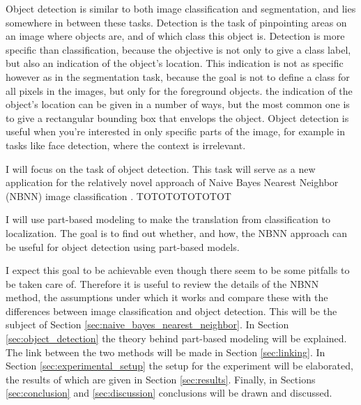 \documentclass[a4paper,10pt]{article}
\begin{document}
Object detection is similar to both image classification and segmentation, and lies somewhere in between these tasks. Detection is the task of pinpointing areas on an image where objects are, and of which class this object is. Detection is more specific than classification, because the objective is not only to give a class label, but also an indication of the object's location. This indication is not as specific however as in the segmentation task, because the goal is not to define a class for all pixels in the images, but only for the foreground objects. the indication of the object's location can be given in a number of ways, but the most common one is to give a rectangular bounding box that envelops the object. Object detection is useful when you're interested in only specific parts of the image, for example in tasks like face detection, where the context is irrelevant. 



I will focus on the task of object detection. This task will serve as a new application for the relatively novel approach of Naive Bayes Nearest Neighbor (NBNN) image classification \cite{boiman2008defense} .  TOTOTOTOTOTOT

I will use part-based modeling  to make the translation from classification to localization. The goal is to find out whether, and how, the NBNN approach can be useful for object detection using part-based models.

I expect this goal to be achievable even though there seem to be some pitfalls to be taken care of. Therefore it is useful to review the details of the NBNN method, the assumptions under which it works and compare these with the differences between image classification and object detection. This will be the subject of Section \ref{sec:naive_bayes_nearest_neighbor}. In Section \ref{sec:object_detection} the theory behind part-based modeling will be explained. The link between the two methods will be made in Section \ref{sec:linking}. In Section \ref{sec:experimental_setup} the setup for the experiment will be elaborated, the results of which are given in Section \ref{sec:results}. Finally, in Sections \ref{sec:conclusion} and \ref{sec:discussion} conclusions will be drawn and discussed.
\end{document}
